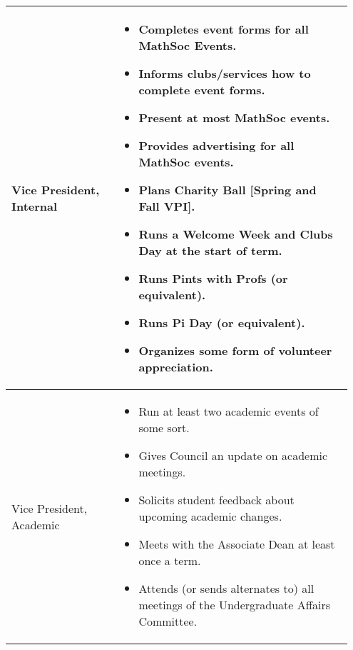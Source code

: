 \begin{longtable}{p{0.3\linewidth} p{0.65\linewidth}}
\midrule
Vice President, Internal & 
\begin{itemize}
\item Completes event forms for all MathSoc Events.
\item Informs clubs/services how to complete event forms.
\item Present at most MathSoc events.
\item Provides advertising for all MathSoc events.
\item Plans Charity Ball [Spring and Fall VPI].
\item Runs a Welcome Week and Clubs Day at the start of term.
\item Runs Pints with Profs (or equivalent).
\item Runs Pi Day (or equivalent).
\item Organizes some form of volunteer appreciation.
\end{itemize}
\\
\midrule
Vice President, Academic &
\begin{itemize}
\item Run at least two academic events of some sort.
\item Gives Council an update on academic meetings.
\item Solicits student feedback about upcoming academic changes.
\item Meets with the Associate Dean at least once a term.
\item Attends (or sends alternates to) all meetings of the Undergraduate Affairs Committee.
\end{itemize}
\\
\bottomrule
\end{longtable}
